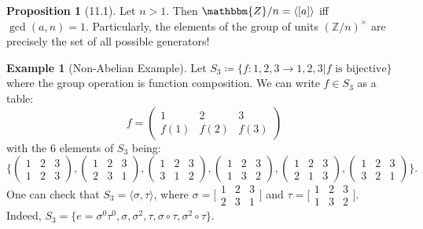 \documentclass{article}
\newcommand{\Z}{\mathbbm{Z}}
\newcommand{\coleq}{\coloneqq}
\newcommand{\func}[3]{#1: #2 \to #3}
\theoremstyle{definition}
\newtheorem*{prop}{Proposition}
\newtheorem*{ex}{Example}
\theoremstyle{remark}
\newcommand{\Znx}{(\mathbb{Z}/n)^\times}
\newcommand{\cyc}[1]{\langle#1\rangle}
\begin{document}
{{            \begin{prop}[11.1]
                Let $n>1$. Then $\Z/n= \cyc{[a]}$ iff $\gcd(a,n)=1$. Particularly, the elements of the group of units $\Znx$ are precisely the set of all possible generators!
            \end{prop}
        }
        \begin{ex}[Non-Abelian Example]
            Let $S_3 \coleq \{\func{f}{1,2,3}{1,2,3}|f \text{ is bijective}\}$ where the group operation is function composition. We can write $f \in S_3$ as a table:
                \[f=\begin{pmatrix}
                    1&2&3\\
                    f(1)&f(2)&f(3)
                \end{pmatrix}\]
            with the 6 elements of $S_3$ being:
                \[\Bigg\{\begin{pmatrix}
                    1&2&3\\
                    1&2&3
                \end{pmatrix},
                \begin{pmatrix}
                    1&2&3\\
                    2&3&1
                \end{pmatrix},
                \begin{pmatrix}
                    1&2&3\\
                    3&1&2
                \end{pmatrix},
                \begin{pmatrix}
                    1&2&3\\
                    1&3&2
                \end{pmatrix},
                \begin{pmatrix}
                    1&2&3\\
                    2&1&3
                \end{pmatrix},
                \begin{pmatrix}
                    1&2&3\\
                    3&2&1
                \end{pmatrix}\Bigg\}.\]
            One can check that $S_3=\cyc{\sigma,\tau}$, where $\sigma=\big[\begin{smallmatrix}1&2&3\\2&3&1\end{smallmatrix}\big]$ and $\tau=\big[\begin{smallmatrix}1&2&3\\1&3&2\end{smallmatrix}\big]$.\\
            Indeed, $S_3=\{e=\sigma^0\tau^0,\sigma,\sigma^2,\tau,\sigma\circ\tau, \sigma^2\circ\tau\}$.
        \end{ex}
        
}
\end{document}
